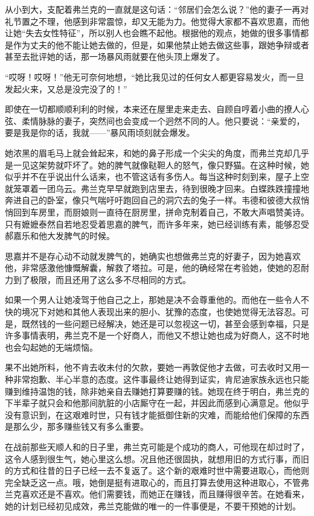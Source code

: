\par 从小到大，支配着弗兰克的一直就是这句话：“邻居们会怎么说？”他的妻子一再对礼节置之不理，他感到非常震惊，却又无能为力。他觉得大家都不喜欢思嘉，而他让她“失去女性特征”，所以别人也会瞧不起他。根据他的观点，她做的很多事情都是作为丈夫的他不能让她去做的，但是，如果他禁止她去做这些事，跟她争辩或者甚至去批评她的话，那一场暴风雨就要在他头顶上爆发了。
\par “哎呀！哎呀！”他无可奈何地想，“她比我见过的任何女人都更容易发火，而一旦发起火来，又总是没完没了的！”
\par 即使在一切都顺顺利利的时候，本来还在屋里走来走去、自顾自哼着小曲的撩人心弦、柔情脉脉的妻子，突然间也会变成一个迥然不同的人。他只要说：“亲爱的，要是我是你的话，我就——”暴风雨顷刻就会爆发。
\par 她浓黑的眉毛马上就会耸起来，和她的鼻子形成一个尖尖的角度，而弗兰克却几乎是一见这架势就吓坏了。她的脾气就像鞑靼人的怒气，像只野猫。在这种时候，她似乎并不在乎说出什么话来，也不管这话有多伤人。每当这种时刻到来，屋子上空就笼罩着一团乌云。弗兰克早早就跑到店里去，待到很晚才回来。白蝶跌跌撞撞地奔进自己的卧室，像只气喘吁吁跑回自己的洞穴去的兔子一样。韦德和彼德大叔悄悄回到车房里，而厨娘则一直待在厨房里，拼命克制着自己，不敢大声唱赞美诗。只有嬷嬷泰然自若地忍受着思嘉的脾气，而许多年来，她已经训练有素，能够忍受郝嘉乐和他大发脾气的时候。
\par 思嘉并不是存心动不动就发脾气的，她确实也想做弗兰克的好妻子，因为她喜欢他，非常感激他慷慨解囊，解救了塔拉。可是，他的确经常在考验她，使她的忍耐力到了极限，而且还用了这么多不尽相同的方式。
\par 如果一个男人让她凌驾于他自己之上，那她是决不会尊重他的。而他在一些令人不快的境况下对她和其他人表现出来的胆小、犹豫的态度，也使她觉得无法容忍。可是，既然钱的一些问题已经解决，她还是可以忽视这一切，甚至会感到幸福，只是许多事情表明，弗兰克不是一个好商人，而他又不想让她也成为好商人，这不时地也会勾起她的无端烦恼。
\par 果不出她所料，他不肯去收未付的欠款，要她一再敦促他才去做，可去收时又用一种非常抱歉、半心半意的态度。这件事最终让她得到证实，肯尼迪家族永远也只能赚到维持温饱的钱，除非她亲自去赚她打算要赚的钱。她现在终于明白，弗兰克的下半辈子就只会和他那间肮脏的小店厮守在一起，并因此而感到心满意足。他似乎没有意识到，在这艰难时世，只有钱才能抵御住新的灾难，而能给他们保障的东西是那么少，那多赚些钱又有多么重要。
\par 在战前那些天顺人和的日子里，弗兰克可能是个成功的商人，可他现在却过时了，这令人感到很生气，她心里这么想。况且他还很固执，就想用旧的方式行事，而旧的方式和往昔的日子已经一去不复返了。这个新的艰难时世中需要进取心，而他则完全缺乏这一点。哦，她倒是挺有进取心的，而且打算去使用这种进取心，不管弗兰克喜欢还是不喜欢。他们需要钱，而她正在赚钱，而且赚得很辛苦。在她看来，她的计划已经初见成效，弗兰克能做的唯一的一件事便是，不要干预她的计划。
